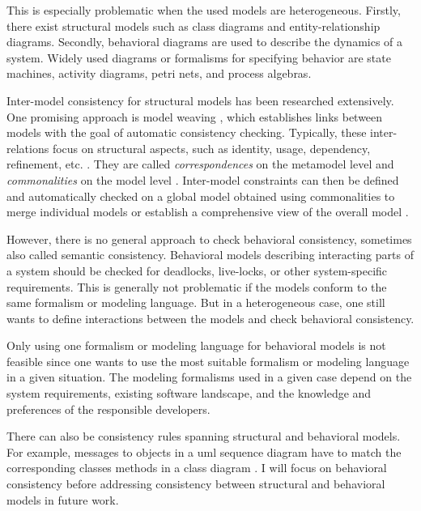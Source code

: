 \documentclass[conference]{IEEEtran}
\begin{document}
This is especially problematic when the used models are heterogeneous.
Firstly, there exist structural models such as class diagrams and entity-relationship diagrams.
Secondly, behavioral diagrams are used to describe the dynamics of a system.
Widely used diagrams or formalisms for specifying behavior are state machines, activity diagrams, petri nets, and process algebras.

Inter-model consistency for structural models has been researched extensively.
One promising approach is model weaving \cite{bezivinCanonicalSchemeModel2006}, which establishes links between models with the goal of automatic consistency checking.
Typically, these inter-relations focus on structural aspects, such as identity, usage, dependency, refinement, etc. \cite{feldmannManagingIntermodelInconsistencies2019, torresSystematicLiteratureReview2020}.
They are called \textit{correspondences} on the metamodel level and \textit{commonalities} on the model level \cite{stunkelMultipleModelSynchronization2020, klareCommonalitiesPreservingConsistency2019}.
Inter-model constraints can then be defined and automatically checked on a global model obtained using commonalities to merge individual models \cite{stunkelMultimodelCorrespondenceIntermodel2018} or establish a comprehensive view of the overall model \cite{stunkelMultipleModelSynchronization2020}.

However, there is no general approach to check behavioral consistency, sometimes also called semantic consistency.
Behavioral models describing interacting parts of a system should be checked for deadlocks, live-locks, or other system-specific requirements.
This is generally not problematic if the models conform to the same formalism or modeling language.
But in a heterogeneous case, one still wants to define interactions between the models and check behavioral consistency.

Only using one formalism or modeling language for behavioral models is not feasible since one wants to use the most suitable formalism or modeling language in a given situation.
The modeling formalisms used in a given case depend on the system requirements, existing software landscape, and the knowledge and preferences of the responsible developers. 

There can also be consistency rules spanning structural and behavioral models.
For example, messages to objects in a \gls{uml} sequence diagram have to match the corresponding classes methods in a class diagram \cite{egyedFixingInconsistenciesUML2007}.
I will focus on behavioral consistency before addressing consistency between structural and behavioral models in future work. 
\end{document}
